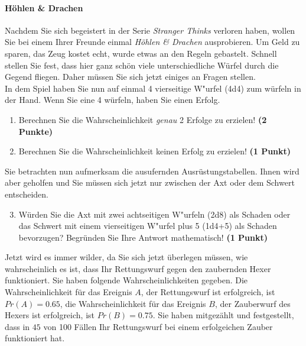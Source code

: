 \documentclass[a4paper, 9pt]{scrartcl}\usepackage[]{graphicx}\usepackage[]{xcolor}
\begin{document}
\paragraph{H{\"o}hlen \& Drachen}



Nachdem Sie sich begeistert in der Serie \textit{Stranger Thinks} verloren
haben, wollen Sie bei einem Ihrer Freunde einmal \textit{H{\"o}hlen \& Drachen}
ausprobieren. Um Geld zu sparen, das Zeug kostet echt, wurde etwas an den
Regeln gebastelt. Schnell stellen Sie fest, dass hier ganz sch{\"o}n viele
unterschiedliche W{\"u}rfel durch die Gegend fliegen. Daher m{\"u}ssen Sie sich
jetzt einiges an Fragen stellen. \\%

In dem Spiel haben Sie nun auf einmal 4 vierseitige W{"u}rfel (4d4) zum w{\"u}rfeln in der Hand. Wenn Sie eine 4 w{\"u}rfeln,
haben Sie einen Erfolg.

\begin{enumerate}
\item Berechnen Sie die Wahrscheinlichkeit \textit{genau}
  2 Erfolge zu erzielen!  \textbf{(2 Punkte)}
\item Berechnen Sie die Wahrscheinlichkeit keinen Erfolg zu erzielen!
  \textbf{(1 Punkt)}
\end{enumerate}

Sie betrachten nun aufmerksam die ausufernden Ausr{\"u}stungstabellen. Ihnen
wird aber geholfen und Sie m{\"u}ssen sich jetzt nur zwischen der Axt oder dem
Schwert entscheiden.

\begin{enumerate}
  \setcounter{enumi}{2}
\item W{\"u}rden Sie die Axt mit zwei achtseitigen W{"u}rfeln (2d8) als Schaden oder
  das Schwert mit einem vierseitigen W{"u}rfel plus 5 (1d4+5) als Schaden bevorzugen?
  Begr{\"u}nden Sie Ihre Antwort mathematisch! \textbf{(1 Punkt)}
\end{enumerate}

Jetzt wird es immer wilder, da Sie sich jetzt {\"u}berlegen m{\"u}ssen, wie
wahrscheinlich es ist, dass Ihr Rettungswurf gegen den zaubernden Hexer
funktioniert. Sie haben folgende Wahrscheinlichkeiten gegeben. Die
Wahrscheinlichkeit f{\"u}r das Ereignis $A$, der Rettungswurf ist erfolgreich,
ist $Pr(A) = 0.65$, die Wahrscheinlichkeit f{\"u}r das Ereignis $B$,
der Zauberwurf des Hexers ist erfolgreich, ist $Pr(B) = 0.75$. Sie
haben mitgez{\"a}hlt und festgestellt, dass in $45$ von 100 F{\"a}llen
Ihr Rettungswurf bei einem erfolgeichen Zauber funktioniert hat.  
\end{document}
